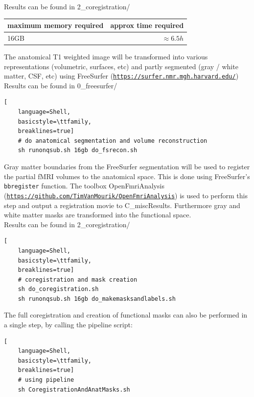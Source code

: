 \documentclass[12pt,a4paper]{scrartcl}
\begin{document}
\noindent Results can be found in 2\_coregistration/\\
\begin{table}[h]
\begin{tabular}{l | r}
\toprule
maximum memory required & approx time required\\\toprule
16GB & $\approx 6.5h$ \\\bottomrule
\end{tabular}
\end{table}
\FloatBarrier
\noindent The anatomical T1 weighted image will be transformed into various representations (volumetric, surfaces, etc) and partly segmented (gray / white matter, CSF, etc) using FreeSurfer (\href{https://surfer.nmr.mgh.harvard.edu/}{\nolinkurl{https://surfer.nmr.mgh.harvard.edu/}})\\

\noindent Results can be found in 0\_freesurfer/\\
\begin{lstlisting}[
    language=Shell,
    basicstyle=\ttfamily,
    breaklines=true]
    # do anatomical segmentation and volume reconstruction
    sh runonqsub.sh 16gb do_fsrecon.sh
\end{lstlisting}
Gray matter boundaries from the FreeSurfer segmentation will be used to register the partial fMRI volumes to the anatomical space. This is done using FreeSurfer's \texttt{bbregister} function. The toolbox OpenFmriAnalysis (\href{https://github.com/TimVanMourik/OpenFmriAnalysis}{\nolinkurl{https://github.com/TimVanMourik/OpenFmriAnalysis}}) is used to perform this step and output a registration movie to C\_miscResults. Furthermore gray and white matter masks are transformed into the functional space.\\

\noindent Results can be found in 2\_coregistration/\\
\begin{lstlisting}[
    language=Shell,
    basicstyle=\ttfamily,
    breaklines=true]
    # coregistration and mask creation
    sh do_coregistration.sh
    sh runonqsub.sh 16gb do_makemasksandlabels.sh
\end{lstlisting}
The full coregistration and creation of functional masks can also be performed in a single step, by calling the pipeline script:
\begin{lstlisting}[
    language=Shell,
    basicstyle=\ttfamily,
    breaklines=true]
    # using pipeline
    sh CoregistrationAndAnatMasks.sh
\end{lstlisting}
\end{document}
